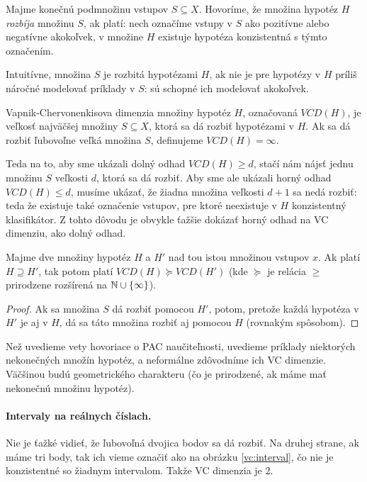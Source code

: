 \begin{definition}
  Majme konečnú podmnožinu vstupov $S \subseteq X$. Hovoríme, že množina
  hypotéz $H$ \emph{rozbíja} množinu $S$, ak platí: nech označíme vstupy
  v $S$ ako pozitívne alebo negatívne akokoľvek, v množine $H$ existuje
  hypotéza konzistentná s týmto označením.
\end{definition}

Intuitívne, množina $S$ je rozbitá hypotézami $H$, ak nie je pre
hypotézy v $H$ príliš náročné modelovať príklady v $S$: sú schopné
ich modelovať akokoľvek.

\begin{definition}
  Vapnik-Chervonenkisova dimenzia množiny hypotéz $H$, označovaná
  $VCD(H)$, je veľkosť najväčšej množiny $S \subseteq X$, ktorá
  sa dá rozbiť hypotézami v $H$. Ak sa dá rozbiť ľubovoľne veľká
  množina $S$, definujeme $VCD(H) = \infty$.
\end{definition}

Teda na to, aby sme ukázali dolný odhad $VCD(H) \geq d$, stačí nám
nájsť jednu množinu $S$ veľkosti $d$, ktorá sa dá rozbiť. Aby sme ale
ukázali horný odhad $VCD(H) \leq d$, musíme ukázať, že žiadna množina
veľkosti $d + 1$ sa nedá rozbiť: teda že existuje také označenie vstupov,
pre ktoré neexistuje v $H$ konzistentný klasifikátor. Z tohto dôvodu je
obvykle ťažšie dokázať horný odhad na VC dimenziu, ako dolný odhad.

\begin{lemma}
  Majme dve množiny hypotéz $H$ a $H'$ nad tou istou množinou vstupov $x$.
  Ak platí $H \supseteq H'$, tak potom platí $VCD(H) \succeq VCD(H')$ (kde
  $\succeq$ je relácia $\geq$ prirodzene rozšírená na $\mathbb{N} \cup \{ \infty \}$).
\end{lemma}
\begin{proof}
  Ak sa množina $S$ dá rozbiť pomocou $H'$, potom, pretože každá hypotéza
  v $H'$ je aj v $H$, dá sa táto množina rozbiť aj pomocou $H$ (rovnakým
  spôsobom).
\end{proof}

Než uvedieme vety hovoriace o PAC naučiteľnosti, uvedieme príklady
niektorých nekonečných množín hypotéz, a neformálne zdôvodníme ich
VC dimenzie. Väčšinou budú geometrického charakteru (čo je prirodzené,
ak máme mať nekonečnú množinu hypotéz).

\paragraph{Intervaly na reálnych číslach.} Nie je ťažké vidieť, že
ľubovoľná dvojica bodov sa dá rozbiť. Na druhej strane, ak máme tri
body, tak ich vieme označiť ako na obrázku \ref{vc:interval}, čo nie
je konzistentné so žiadnym intervalom. Takže VC dimenzia je $2$.

